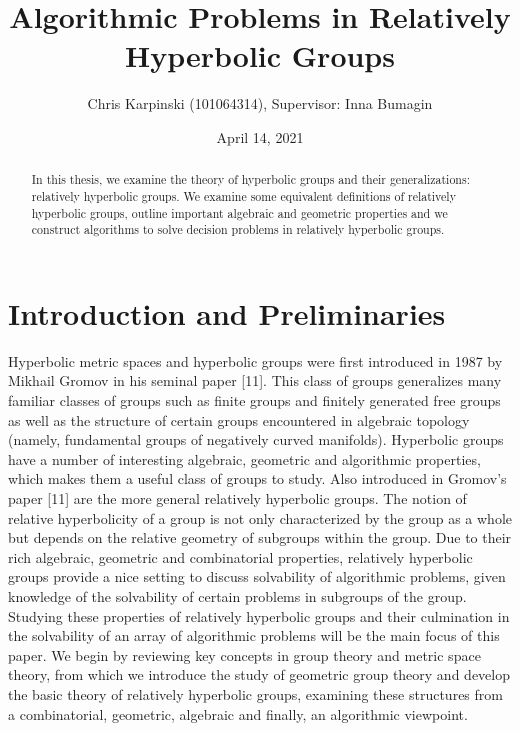 \documentclass[12pt]{article}
\title{Algorithmic Problems in Relatively Hyperbolic Groups}
\author{Chris Karpinski (101064314), Supervisor: Inna Bumagin}
\date{April 14, 2021}
\begin{document}
	
	\maketitle
	
	\begin{abstract}
		
		In this thesis, we examine the theory of hyperbolic groups and their generalizations: relatively hyperbolic groups. We examine some equivalent definitions of relatively hyperbolic groups, outline important algebraic and geometric properties and we construct algorithms to solve decision problems in relatively hyperbolic groups. 
		
	\end{abstract}
	
	\tableofcontents
	
	
	\newpage
	\section{Introduction and Preliminaries}
	
	Hyperbolic metric spaces and hyperbolic groups were first introduced in 1987 by Mikhail Gromov in his seminal paper [11]. This class of groups generalizes many familiar classes of groups such as finite groups and finitely generated free groups as well as the structure of certain groups encountered in algebraic topology (namely, fundamental groups of negatively curved manifolds). Hyperbolic groups have a number of interesting algebraic, geometric and algorithmic properties, which makes them a useful class of groups to study. Also introduced in Gromov's paper [11] are the more general relatively hyperbolic groups. The notion of relative hyperbolicity of a group is not only characterized by the group as a whole but depends on the relative geometry of subgroups within the group. Due to their rich algebraic, geometric and combinatorial properties, relatively hyperbolic groups provide a nice setting to discuss solvability of algorithmic problems, given knowledge of the solvability of certain problems in subgroups of the group. Studying these properties of relatively hyperbolic groups and their culmination in the solvability of an array of algorithmic problems will be the main focus of this paper. We begin by reviewing key concepts in group theory and metric space theory, from which we introduce the study of geometric group theory and develop the basic theory of relatively hyperbolic groups, examining these structures from a combinatorial, geometric, algebraic and finally, an algorithmic viewpoint. 
	
\end{document}
